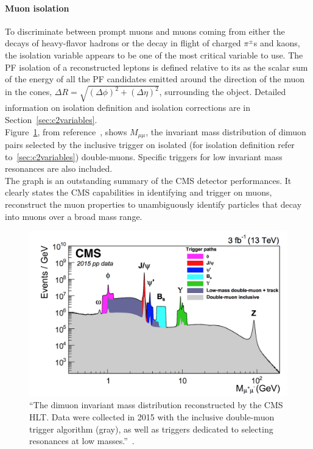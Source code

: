 \paragraph{Muon isolation}\label{sec:muoniso}
To discriminate between prompt muons and muons coming from either the decays
of heavy-flavor hadrons or the decay in flight of charged $\pi^{\pm}$s and kaons, the isolation variable appears to be one of
the most critical variable to use. The PF isolation of a reconstructed
leptons is defined relative to its \pt as the scalar
sum of the energy of all the PF candidates emitted around the
direction of the muon in the cones, $\Delta R = \sqrt{(\Delta
  \phi)^2+(\Delta \eta)^2}$, surrounding the object. Detailed
information on isolation definition and isolation corrections are in Section~\ref{sec:c2variables}.\\


Figure~\ref{fig:dimuon}, from reference~\cite{Sirunyan_2018_muon}, shows $M_{\mu \mu}$, the invariant mass distribution of dimuon pairs selected by
the inclusive trigger on isolated (for isolation definition refer
to~\ref{sec:c2variables}) double-muons. Specific triggers for low
invariant mass resonances are also included.\\
The graph is an
outstanding summary of the CMS detector performances. It clearly states
the CMS capabilities in identifying and trigger on
muons, reconstruct the muon properties to unambiguously
identify particles that decay into muons over a broad mass range.

 \begin{figure}[h]
\centering
\includegraphics[clip,trim=1.2cm 0.1cm 0.5cm 0.3cm, width=.65\textwidth]{Figures/c2/dimuon}
\caption{``The dimuon invariant mass distribution reconstructed by the CMS HLT. Data were
collected in 2015 with the inclusive double-muon trigger algorithm (gray), as well as triggers
dedicated to selecting resonances at low masses.''~\cite{Sirunyan_2018_muon}.}
\label{fig:dimuon}
\end{figure}


